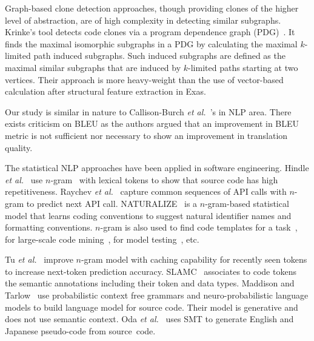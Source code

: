 Graph-based clone detection approaches, though providing clones of the
higher level of abstraction, are of high complexity in detecting
similar subgraphs. Krinke's tool detects code clones via a program
dependence graph (PDG)~\cite{krinke01}. It finds the maximal
isomorphic subgraphs in a PDG by calculating the maximal $k$-limited
path induced subgraphs. Such induced subgraphs are defined as the
maximal similar subgraphs that are induced by $k$-limited paths
starting at two vertices. Their approach is more heavy-weight than the
use of vector-based calculation after structural feature extraction in
Exas.


Our study
is similar in nature to Callison-Burch {\em et al.}~\cite{Callison}'s
in NLP area. There exists criticism on BLEU as the authors argued that
an improvement in BLEU metric is not sufficient nor necessary to show
an improvement in translation quality.


The statistical NLP approaches have been applied in software
engineering. Hindle {\em et al.}~\cite{natural} use
$n$-gram~\cite{manning99} with lexical tokens to show that source code
has high repetitiveness. 
%
Raychev {\em et al.}~\cite{ethz-pldi14} capture common sequences of
API calls with $n$-gram to predict next API call.
NATURALIZE~\cite{barr-codeconvention-fse14} is a $n$-gram-based
statistical model that learns coding conventions to suggest natural
identifier names and formatting conventions.  $n$-gram is also used to
find code templates for a task~\cite{jacob10}, for large-scale
code mining~\cite{sutton-msr13}, for model
testing~\cite{tonella-icse14}, etc.

Tu {\em et al.}~\cite{tu-fse14} improve $n$-gram model with caching
capability for recently seen tokens to increase next-token prediction
accuracy.
%
SLAMC~\cite{fse13} associates to code tokens the semantic
annotations including their token and data types.
%
Maddison and Tarlow~\cite{tarlow14} use probabilistic context free
grammars and neuro-probabilistic language models to build language
model for source code. Their model is generative and does not use
semantic context. Oda {\em et al.}~\cite{hide-ase15} uses SMT to
generate English and Japanese pseudo-code from source~code.
